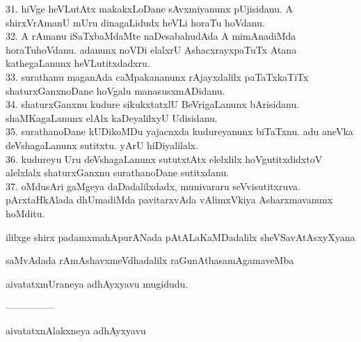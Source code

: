 \documentclass{article}
\begin{document}
31. hiVge heVLutAtx makakxLoDane sAvxmiyanunx pUjisidanu. A shirxVrAmanU mUru dinagaLidudx heVLi horaTu hoVdanu.\\
32. A rAmanu iSaTxbaMdaMte naDesabahudAda A mimAnadiMda horaTuhoVdanu. adanunx noVDi elalxrU AshacxrayxpaTuTx Atana kathegaLanunx heVLutitxdadxru.\\
33. surathanu maganAda caMpakananunx rAjayxdalilx paTaTxkaTiTx shaturxGanxnoDane hoVgalu manasusxmADidanu.\\
34. shaturxGanxnu kudure sikukxtatxlU BeVrigaLanunx bArisidanu. shaMKagaLanunx elAlx kaDeyalilxyU Udisidanu.\\
35. surathanoDane kUDikoMDu yajacnxda kudureyanunx biTaTxnu. adu aneVka deVshagaLanunx sutitxtu. yArU hiDiyalilalx.\\
36. kudureyu Uru deVshagaLanunx sututxtAtx elelxlilx hoVgutitxdidxtoV alelxlalx shaturxGanxnu surathanoDane sutitxdanu.\\
37. oMdusAri gaMgeya daDadalilxdadx, munivararu seVvisutitxruva. pArxtaHkAlada dhUmadiMda pavitarxvAda vAlimxVkiya Asharxmavanunx hoMditu.

\begin{center}
ililxge shirx padamxmahApurANada pAtALaKaMDadalilx sheVSavAtAsxyXyana
\end{center}

\begin{center}
saMvAdada rAmAshavxmeVdhadalilx raGunAthasamAgamaveMba
\end{center}

\begin{center}
aivatatxmUraneya adhAyxyavu mugidudu.
\end{center}

\begin{center}
---------------
\end{center}

\begin{center}
aivatatxnAlakxneya adhAyxyavu
\end{center}
\end{document}
